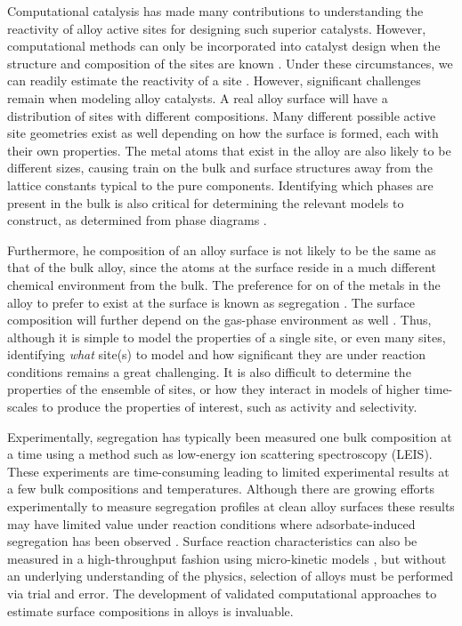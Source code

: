 \documentclass[12pt]{cmuthesis}
\begin{document}
Computational catalysis has made many contributions to understanding the reactivity of alloy active sites for designing such superior catalysts. However, computational methods can only be incorporated into catalyst design when the structure and composition of the sites are known \cite{kitchin-2008-densit-funct}. Under these circumstances, we can readily estimate the reactivity of a site \cite{greeley-2005,inoglu-2010-new-solid}. However, significant challenges remain when modeling alloy catalysts. A real alloy surface will have a distribution of sites with different compositions. Many different possible active site geometries exist as well depending on how the surface is formed, each with their own properties. The metal atoms that exist in the alloy are also likely to be different sizes, causing train on the bulk and surface structures away from the lattice constants typical to the pure components. Identifying which phases are present in the bulk is also critical for determining the relevant models to construct, as determined from phase diagrams \cite{geng-2017-first-princ}.

Furthermore, he composition of an alloy surface is not likely to be the same as that of the bulk alloy, since the atoms at the surface reside in a much different chemical environment from the bulk. The preference for on of the metals in the alloy to prefer to exist at the surface is known as segregation \cite{dowben-1990-surfac-segreg-phenom}. The surface composition will further depend on the gas-phase environment as well \cite{kitchin-2008-alloy}. Thus, although it is simple to model the properties of a single site, or even many sites, identifying \emph{what} site(s) to model and how significant they are under reaction conditions remains a great challenging. It is also difficult to determine the properties of the ensemble of sites, or how they interact in models of higher time-scales to produce the properties of interest, such as activity and selectivity.

Experimentally, segregation has typically been measured one bulk composition at a time \cite{chen-2006-natur-activ,bocarme-2009-surfac-segreg,haire-2011-influen-prepar} using a method such as low-energy ion scattering spectroscopy (LEIS). These experiments are time-consuming leading to limited experimental results at a few bulk compositions and temperatures. Although there are growing efforts experimentally to measure segregation profiles at clean alloy surfaces \cite{miller-2008-surfac-segreg,priyadarshini-2011-high-throug} these results may have limited value under reaction conditions where adsorbate-induced segregation has been observed \cite{kitchin-2008-alloy,menning-2009-gener-trend,kim-2013-co-adsor}. Surface reaction characteristics can also be measured in a high-throughput fashion using micro-kinetic models \cite{gumuslu-2015-correl-elect}, but without an underlying understanding of the physics, selection of alloys must be performed via trial and error. The development of validated computational approaches to estimate surface compositions in alloys is invaluable.
\end{document}
